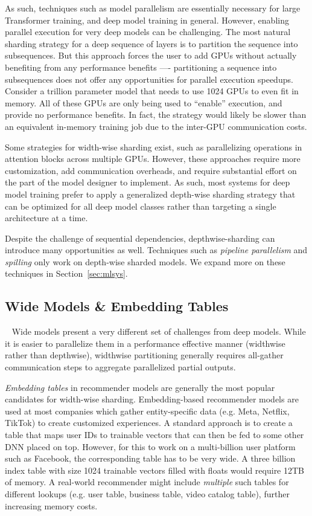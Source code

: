 As such, techniques such as model parallelism are essentially necessary for large Transformer training, and deep model training in general. However, enabling parallel execution for very deep models can be challenging. The most natural sharding strategy for a deep sequence of layers is to partition the sequence into subsequences. But this approach forces the user to add GPUs without actually benefiting from any performance benefits ---- partitioning a sequence into subsequences does not offer any opportunities for parallel execution speedups. Consider a trillion parameter model that needs to use 1024 GPUs to even fit in memory. All of these GPUs are only being used to ``enable'' execution, and provide no performance benefits. In fact, the strategy would likely be slower than an equivalent in-memory training job due to the inter-GPU communication costs.

Some strategies for width-wise sharding exist, such as parallelizing operations in attention blocks across multiple GPUs. However, these approaches require more customization, add communication overheads, and require substantial effort on the part of the model designer to implement. As such, most systems for deep model training prefer to apply a generalized depth-wise sharding strategy that can be optimized for all deep model classes rather than targeting a single architecture at a time.

Despite the challenge of sequential dependencies, depthwise-sharding can introduce many opportunities as well. Techniques such as \textit{pipeline parallelism} and \textit{spilling} only work on depth-wise sharded models. We expand more on these techniques in Section~\ref{sec:mlsys}.

\subsection{Wide Models \& Embedding Tables}~\label{sec:embedding}
Wide models present a very different set of challenges from deep models. While it is easier to parallelize them in a performance effective manner (widthwise rather than depthwise), widthwise partitioning generally requires all-gather communication steps to aggregate parallelized partial outputs.

 \textit{Embedding tables} in recommender models are generally the most popular candidates for width-wise sharding. Embedding-based recommender models are used at most companies which gather entity-specific data (e.g. Meta, Netflix, TikTok) to create customized experiences. A standard approach is to create a table that maps user IDs to trainable vectors that can then be fed to some other DNN placed on top. However, for this to work on a multi-billion user platform such as Facebook, the corresponding table has to be very wide. A three billion index table with size 1024 trainable vectors filled with floats would require 12TB of memory. A real-world recommender might include \textit{multiple} such tables for different lookups (e.g. user table, business table, video catalog table), further increasing memory costs. 

